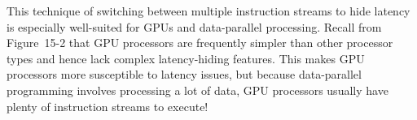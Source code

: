 This technique of switching between multiple instruction streams to hide latency is especially well-suited for GPUs and data-parallel processing. Recall from Figure 15-2 that GPU processors are frequently simpler than other processor types and hence lack complex latency-hiding features. This makes GPU processors more susceptible to latency issues, but because data-parallel programming involves processing a lot of data, GPU processors usually have plenty of instruction streams to execute!\par














